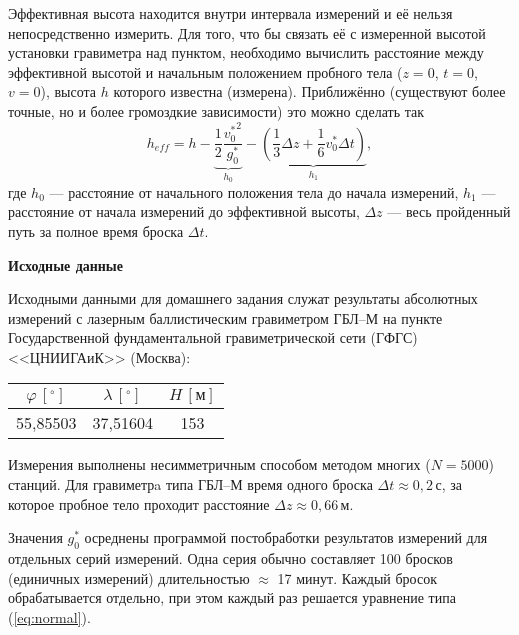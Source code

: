 \documentclass[12pt, a4paper]{article}
\theoremstyle{remark}
\renewcommand{\phi}{\ensuremath{\varphi}}
\begin{document}
Эффективная высота находится внутри интервала измерений и её нельзя непосредственно измерить. 
Для того, что бы связать её с измеренной высотой
установки гравиметра над пунктом, необходимо вычислить расстояние между эффективной высотой и
начальным положением пробного тела ($z = 0$, $t = 0$, $v=0$), высота $h$ которого известна
(измерена). Приближённо (существуют более точные, но и более громоздкие зависимости) 
это можно сделать так 
\begin{equation*}
    h_{eff} = h - \underbrace{\dfrac{1}{2}\dfrac{{v^*_0}^2}{g_0^*}}_{h_0} - 
    \underbrace{\left( \dfrac{1}{3}\Delta z + \dfrac{1}{6}
    v_0^*\Delta t \right)}_{h_1},
\end{equation*}
где $h_0$ --- расстояние от начального положения тела до начала измерений, $h_1$ --- расстояние от
начала измерений до эффективной высоты, $\Delta z$ --- весь пройденный путь за полное время броска $\Delta t$.
\newpage
\begin{center}
    \textbf{Исходные данные}
\end{center}
Исходными данными для домашнего задания служат результаты абсолютных измерений с лазерным
баллистическим гравиметром ГБЛ--М на
пункте Государственной фундаментальной гравиметрической сети (ГФГС) <<ЦНИИГАиК>> (Москва): 
        \begin{table}[h]
            \centering
            \begin{tabular}{|c|c|c|}
                \hline
                 $\phi\, [^\circ]$ & $\lambda\, [^\circ]$ &$H\, [\text{м}]$ \\\hline
                 55,85503 & 37,51604 & 153\\\hline
            \end{tabular}
        \end{table}

Измерения выполнены несимметричным способом методом многих ($N = 5000$) станций. Для гравиметрa типа
ГБЛ--М время одного броска $\Delta t \approx 0,2 \,\text{с}$, за которое пробное тело проходит расстояние
$\Delta z\approx 0,66\,\text{м}$.

Значения $g_0^*$ осреднены программой постобработки результатов измерений для отдельных серий измерений.
Одна серия обычно составляет 100 бросков (единичных измерений) длительностью $\approx$ 17 минут.
Каждый бросок обрабатывается отдельно, при этом каждый раз решается уравнение типа (\ref{eq:normal}).
\end{document}

